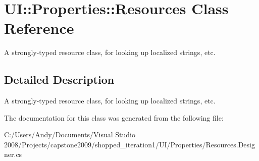 \hypertarget{class_u_i_1_1_properties_1_1_resources}{
\section{UI::Properties::Resources Class Reference}
\label{class_u_i_1_1_properties_1_1_resources}
}


A strongly-\/typed resource class, for looking up localized strings, etc.  


\subsection{Detailed Description}
A strongly-\/typed resource class, for looking up localized strings, etc. 

The documentation for this class was generated from the following file:\begin{DoxyCompactItemize}
\item 
C:/Users/Andy/Documents/Visual Studio 2008/Projects/capstone2009/shopped\_\-iteration1/UI/Properties/Resources.Designer.cs\end{DoxyCompactItemize}
